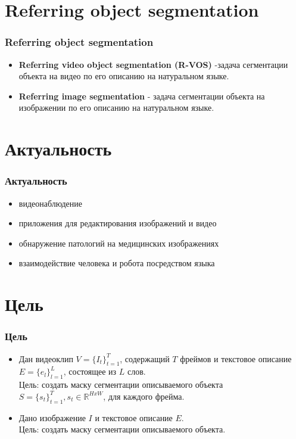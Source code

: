 
\section{Referring object segmentation}

\begin{frame}
  \frametitle{Referring object segmentation}
  \begin{itemize}
    \item \textbf{Referring video object segmentation (R-VOS)} -задача сегментации объекта на видео по его описанию на натуральном языке.
    \item \textbf{Referring image segmentation} - задача сегментации объекта на изображении по его описанию на натуральном языке.
    
  \end{itemize}
\end{frame}


\section{Актуальность}

\begin{frame}
  \frametitle{Актуальность}
  \begin{itemize}
    \item видеонаблюдение 
    \item приложения для редактирования изображений и видео 
    \item обнаружение патологий на медицинских изображениях
    \item взаимодействие человека и робота посредством языка
  \end{itemize}
  
\end{frame}


\section{Цель}
\begin{frame}
    \frametitle{Цель}
    \begin{itemize}
        \item Дан видеоклип \(V=\{I_t\}_{t=1}^{T}\), содержащий \(T\) фреймов и 
        текстовое описание \(E=\{e_l\}_{l=1}^L\), состоящее из \(L\) слов. \\
        Цель: создать маску сегментации описываемого объекта 
        \(S=\{s_t\}_{t=1}^T, s_t \in \mathbb{R}^{HxW}\), для каждого фрейма. 
        \item Дано изображение \(I\) и текстовое описание \(E\). \\Цель: создать маску сегментации описываемого объекта.

    \end{itemize}
\end{frame}
